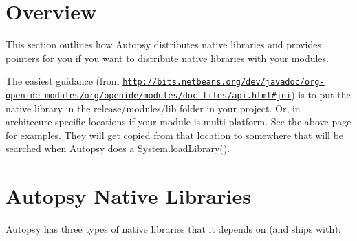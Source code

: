 \hypertarget{native_page_native_overview}{}\section{Overview}\label{native_page_native_overview}
This section outlines how Autopsy distributes native libraries and provides pointers for you if you want to distribute native libraries with your modules.

The easiest guidance (from \href{http://bits.netbeans.org/dev/javadoc/org-openide-modules/org/openide/modules/doc-files/api.html#jni}{\tt http\+://bits.\+netbeans.\+org/dev/javadoc/org-\/openide-\/modules/org/openide/modules/doc-\/files/api.\+html\#jni}) is to put the native library in the {\ttfamily release/modules/lib} folder in your project. Or, in architecure-\/specific locations if your module is multi-\/platform. See the above page for examples. They will get copied from that location to somewhere that will be searched when Autopsy does a {\ttfamily System.\+load\+Library()}.\hypertarget{native_page_native_autopsy}{}\section{Autopsy Native Libraries}\label{native_page_native_autopsy}
Autopsy has three types of native libraries that it depends on (and ships with)\+:
